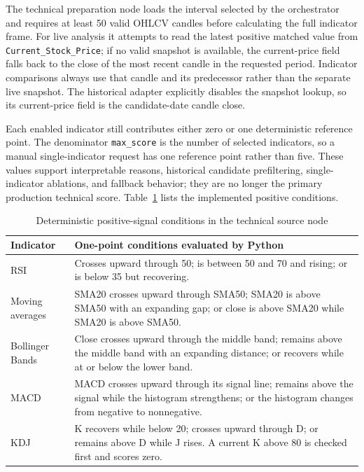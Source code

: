The technical preparation node loads the interval selected by the orchestrator and requires at least 50 valid OHLCV candles before calculating the full indicator frame. For live analysis it attempts to read the latest positive matched value from \texttt{Current\_Stock\_Price}; if no valid snapshot is available, the current-price field falls back to the close of the most recent candle in the requested period. Indicator comparisons always use that candle and its predecessor rather than the separate live snapshot. The historical adapter explicitly disables the snapshot lookup, so its current-price field is the candidate-date candle close.

Each enabled indicator still contributes either zero or one deterministic reference point. The denominator \texttt{max\_score} is the number of selected indicators, so a manual single-indicator request has one reference point rather than five. These values support interpretable reasons, historical candidate prefiltering, single-indicator ablations, and fallback behavior; they are no longer the primary production technical score. Table~\ref{tab:technical-signal-scoring} lists the implemented positive conditions.

\begin{table}[H]
    \centering
    \caption{Deterministic positive-signal conditions in the technical source node}
    \label{tab:technical-signal-scoring}
    \footnotesize
    \setlength{\tabcolsep}{4pt}
    \renewcommand{\arraystretch}{1.18}
    \begin{tabular}{p{1.65cm} p{10.9cm}}
        \toprule
        \textbf{Indicator} & \textbf{One-point conditions evaluated by Python} \\
        \midrule
        RSI & Crosses upward through 50; is between 50 and 70 and rising; or is below 35 but recovering. \\
        Moving averages & SMA20 crosses upward through SMA50; SMA20 is above SMA50 with an expanding gap; or close is above SMA20 while SMA20 is above SMA50. \\
        Bollinger Bands & Close crosses upward through the middle band; remains above the middle band with an expanding distance; or recovers while at or below the lower band. \\
        MACD & MACD crosses upward through its signal line; remains above the signal while the histogram strengthens; or the histogram changes from negative to nonnegative. \\
        KDJ & K recovers while below 20; crosses upward through D; or remains above D while J rises. A current K above 80 is checked first and scores zero. \\
        \bottomrule
    \end{tabular}
\end{table}

